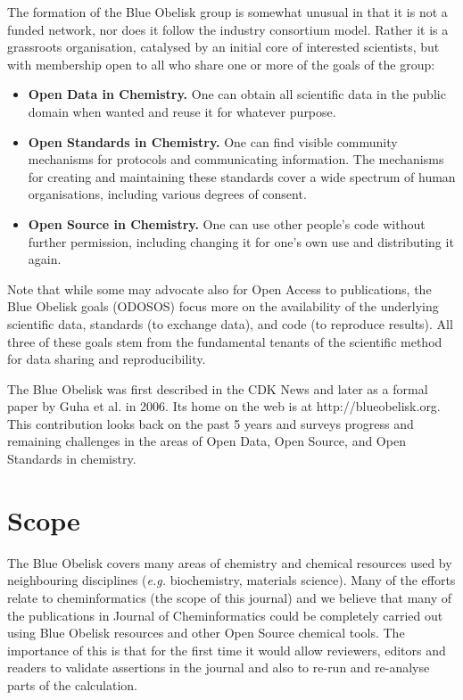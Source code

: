 \documentclass[10pt]{bmc_article}
\newenvironment{bmcformat}{\fussy\setboolean{publ}{true}}{\fussy}
\begin{document}
\begin{bmcformat}
The formation of the Blue Obelisk group is somewhat unusual in that it
is not a funded network, nor does it follow the industry consortium
model. Rather it is a grassroots organisation, catalysed by an initial
core of interested scientists, but with membership open to all who
share one or more of the goals of the group:
\begin{itemize}
\item {\bf Open Data in Chemistry.} One can obtain all scientific data in the public domain when
wanted and reuse it for whatever purpose.
\item {\bf Open Standards in Chemistry.} One can find visible community mechanisms for
protocols and communicating information. The mechanisms for creating
and maintaining these standards cover a wide spectrum of human
organisations, including various degrees of consent.
\item {\bf Open Source in Chemistry.} One can use other people's code without further
permission, including changing it for one's own use and distributing
it again.
\end{itemize}

Note that while some may advocate also for Open Access to
publications, the Blue Obelisk goals (ODOSOS) focus more on the
availability of the underlying scientific data, standards (to exchange
data), and code (to reproduce results). All three of these goals stem
from the fundamental tenants of the scientific method for data sharing
and reproducibility.

The Blue Obelisk was first described in the CDK News \cite{CDKNewsBO} and
later as a formal paper by Guha et al.\cite{Guha2006} in
2006. Its home on the web is at http://blueobelisk.org.
This contribution looks back on the past 5 years and surveys
progress and remaining challenges in the areas of Open Data, Open
Source, and Open Standards in chemistry.


\section*{Scope}
The Blue Obelisk covers many areas of chemistry and chemical resources
used by neighbouring disciplines ({\it e.g.} biochemistry, materials
science). Many of the efforts relate to cheminformatics (the scope of
this journal) and we believe that many of the publications in Journal of
Cheminformatics could be completely carried out using Blue Obelisk resources
and other Open Source chemical tools. The importance of this is that for the
first time it would allow reviewers, editors and readers to validate
assertions in the journal and also to re-run and re-analyse parts of
the calculation.


\end{bmcformat}
\end{document}
